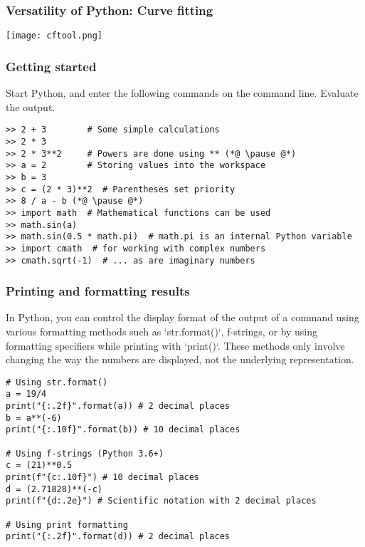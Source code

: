 \begin{frame}
\frametitle{Versatility of Python: Curve fitting}
\centering\texttt{[image: cftool.png]}
\end{frame}

\begin{frame}[fragile]
  \frametitle{Getting started}
   Start Python, and enter the following commands on the command line. Evaluate the output.
   \pause
   \begin{lstlisting}
>> 2 + 3        # Some simple calculations
>> 2 * 3
>> 2 * 3**2     # Powers are done using ** (*@ \pause @*)
>> a = 2        # Storing values into the workspace
>> b = 3
>> c = (2 * 3)**2  # Parentheses set priority
>> 8 / a - b (*@ \pause @*)
>> import math  # Mathematical functions can be used 
>> math.sin(a)  
>> math.sin(0.5 * math.pi)  # math.pi is an internal Python variable
>> import cmath  # for working with complex numbers
>> cmath.sqrt(-1)  # ... as are imaginary numbers    
   \end{lstlisting}
 \end{frame}
 

 \begin{frame}[fragile]
  \frametitle{Printing and formatting results}
  In Python, you can control the display format of the output of a command using various formatting methods such as `str.format()`, f-strings, or by using formatting specifiers while printing with `print()`. These methods only involve changing the way the numbers are displayed, not the underlying representation.
  
  \begin{lstlisting}
# Using str.format()
a = 19/4
print("{:.2f}".format(a)) # 2 decimal places
b = a**(-6)
print("{:.10f}".format(b)) # 10 decimal places

# Using f-strings (Python 3.6+)
c = (21)**0.5
print(f"{c:.10f}") # 10 decimal places
d = (2.71828)**(-c) 
print(f"{d:.2e}") # Scientific notation with 2 decimal places

# Using print formatting
print("{:.2f}".format(d)) # 2 decimal places
  \end{lstlisting}
\end{frame}

